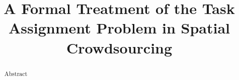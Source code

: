 \documentclass{sig-alternate}
\title{A Formal Treatment of the Task Assignment Problem in Spatial Crowdsourcing}
\begin{document}

\maketitle
\begin{abstract}
Abstract
\end{abstract}











%





\begin{scriptsize}


\end{scriptsize}

%
\end{document}
